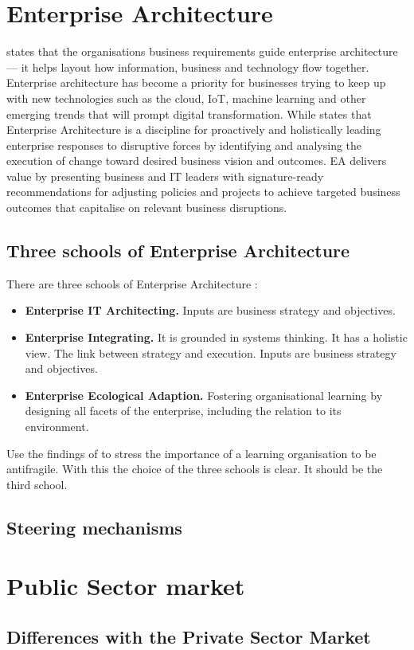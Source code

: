 \section{Enterprise Architecture}
\label{sec:tbea}

\textcite{White2018} states that the organisations business requirements guide enterprise architecture — it helps layout how information, business and technology flow together. Enterprise architecture has become a priority for businesses trying to keep up with new technologies such as the cloud, IoT, machine learning and other emerging trends that will prompt digital transformation.
While \textcite{Gartner} states that Enterprise Architecture is a discipline for proactively and holistically leading enterprise responses to disruptive forces by identifying and analysing the execution of change toward desired business vision and outcomes. EA delivers value by presenting business and IT leaders with signature-ready recommendations for adjusting policies and projects to achieve targeted business outcomes that capitalise on relevant business disruptions. 

\subsection{Three schools of Enterprise Architecture}

There are three schools of Enterprise Architecture \parencite{Lapalme2012}:
\begin{itemize}
	\item{\textbf{Enterprise IT Architecting.} Inputs are business strategy and objectives.}
	\item{\textbf{Enterprise Integrating.} It is grounded in systems thinking. It has a holistic view. The link between strategy and execution. Inputs are business strategy and objectives.}
	\item{\textbf{Enterprise Ecological Adaption.} Fostering organisational learning by designing all facets of the enterprise, including the relation to its environment.}
\end{itemize}

\begin{remark}
	Use the findings of \parencite{Botjes2020} to stress the importance of a learning organisation to be antifragile. With this the choice of the three schools is clear. It should be the third school.
\end{remark}

\subsection{Steering mechanisms}
\label{sub:tbeasteering}

\section{Public Sector market}
\label{sec:tbpsmarket}

\subsection{Differences with the Private Sector Market}
\label{sub:tbdifferenceprivatesector}
